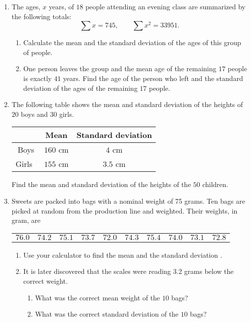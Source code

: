 \begin{enumerate}
	\item The ages, $x$ years, of $18$ people attending an evening class are summarized by the following totals:
	\[
	\sum x = 745,  \qquad \sum x^2 = 33951.
	\]
	\begin{enumerate}
		\item Calculate the mean and the standard deviation of the ages of this group of people.
		\item One person leaves the group and the mean age of the remaining $17$ people is exactly $41$ years. Find the age of the person who left and the standard deviation of the ages of the remaining $17$ people.
	\end{enumerate}
	
	
	\item The following table shows the mean and standard deviation of the heights of $20$ boys and $30$ girls.
	
	\medskip
	\begin{table}[!htpb]
		\centering

\begin{tabular}{|c|c|c|} 
	\cline{2-3}
	\multicolumn{1}{l|}{} & Mean   & Standard deviation  \\ 
	\hline
	Boys                  & $160$ \si{\cm}  & $4$ cm               \\ 
	\hline
	Girls~                & $155$ cm & $3.5$ cm              \\
	\hline
\end{tabular}
	\end{table}
Find the mean and standard deviation of the heights of the $50$ children.


\item  Sweets are packed into bags with a nominal weight of 75 grams. Ten bags are picked at random from the production line and weighted. Their weights, in gram, are 

\vspace{5 pt}

\begin{tabular}{cccccccccc}
	\rule[-1ex]{0pt}{2.5ex}  $76.0$ &$74.2$ & $75.1$ & $73.7$ & $72.0$ & $74.3$ & $75.4$ & $74.0$ & $73.1$ & $72.8$ \\

\end{tabular}

\smallskip

	\begin{enumerate}
		\item Use your calculator to find the mean and the standard deviation .
		\item It is later discovered that the scales were reading 3.2 grams below the correct weight.
		\begin{enumerate}
			\item What was the correct mean weight of the $10$ bags?
			\item What was the correct standard deviation of the $10$ bags?
		\end{enumerate}
	\end{enumerate}



\end{enumerate}
